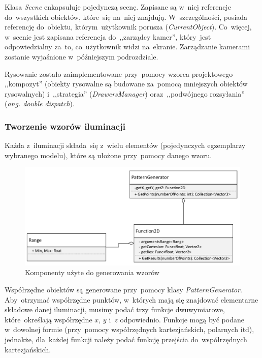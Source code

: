 \documentclass[11pt, a4paper, oneside]{scrartcl}
\begin{document}
Klasa \textit{Scene} enkapsuluje pojedynczą scenę. Zapisane są w~niej referencje do~wszystkich obiektów, które~się na~niej znajdują.
W~szczególności, posiada referencję do~obiektu, którym~użytkownik porusza (\textit{CurrentObject}).
Co~więcej, w~scenie jest zapisana referencja do~,,zarządcy kamer'', który~jest odpowiedzialny za~to, co~użytkownik widzi na~ekranie.
Zarządzanie kamerami zostanie wyjaśnione w~późniejszym podrozdziale.

Rysowanie zostało zaimplementowane przy~pomocy wzorca projektowego ,,kompozyt'' (obiekty rysowalne są budowane za~pomocą mniejszych
obiektów rysowalnych) i~,,strategia'' (\textit{DrawersManager}) oraz~,,podwójnego rozsyłania'' (\textit{ang. double dispatch}).

\subsubsection{Tworzenie wzorów iluminacji}
Każda z~iluminacji składa~się  z~wielu elementów (pojedynczych egzemplarzy wybranego modelu), które są ułożone przy~pomocy danego wzoru.
\begin{figure}[H]
	\centering 
	\includegraphics[scale=0.6]{PatternGenerator.pdf}
	\caption{Komponenty użyte do generowania wzorów}\label{fig:pictures}
\end{figure}
Współrzędne obiektów są generowane przy~pomocy klasy \textit{PatternGenerator}. Aby~otrzymać współrzędne punktów, w~których
mają się znajdować elementarne składowe danej iluminacji, musimy podać trzy funkcje dwuwymiarowe, które~określają współrzędne $x$, $y$ i~$z$
odpowiednio. Funkcje mogą być podane w~dowolnej formie (przy~pomocy współrzędnych kartezjańskich, polarnych itd), jednakże, dla~każdej
funkcji należy podać funkcję przejścia do~współrzędnych kartezjańskich.
\end{document}
